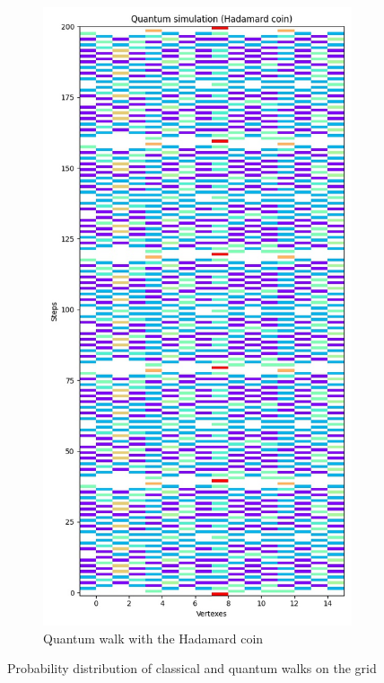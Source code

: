 \begin{figure}[H]
\begin{subfigure}{.45\linewidth}
  \end{subfigure}
  \begin{subfigure}{.45\linewidth}
    \centering
    \includegraphics[width=\linewidth]{./figures/results/grid/hadamard.jpg}
    \caption{Quantum walk with the Hadamard coin}
  \end{subfigure}
  \caption{Probability distribution of classical and quantum walks on the grid}
\end{figure}

